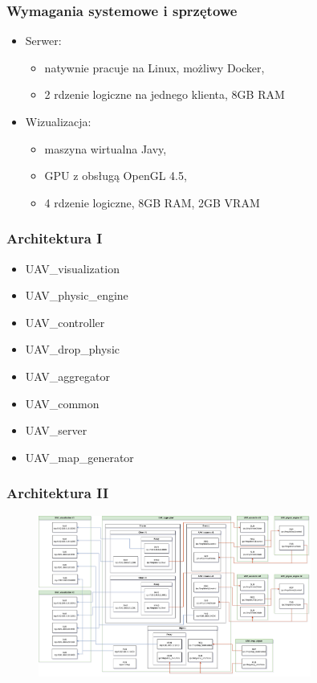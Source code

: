\documentclass[aspectratio=169]{beamer}
\begin{document}
\begin{frame}
	\frametitle{Wymagania systemowe i sprzętowe}
	\begin{itemize}
	\item<2-> Serwer:
		\begin{itemize}
		\item<3-> natywnie pracuje na Linux, możliwy Docker,
		\item<4-> 2 rdzenie logiczne na jednego klienta, 8GB RAM 
		\end{itemize}
	\item<5-> Wizualizacja:
		\begin{itemize}
		\item<6-> maszyna wirtualna Javy,
		\item<7-> GPU z obsługą OpenGL 4.5,
		\item<8-> 4 rdzenie logiczne, 8GB RAM, 2GB VRAM 
		\end{itemize}	
	\end{itemize}
\end{frame}


\begin{frame} %
	\frametitle{Architektura I}
	\begin{itemize}
		\item<2-> UAV\_visualization
		\item<3-> UAV\_physic\_engine
		\item<4-> UAV\_controller
		\item<5-> UAV\_drop\_physic
		\item<6-> UAV\_aggregator
		\item<7-> UAV\_common
		\item<8-> UAV\_server
		\item<9-> UAV\_map\_generator
	\end{itemize}
\end{frame}

\begin{frame}
	\frametitle{Architektura II}
	\begin{figure}
		\centering
		\includegraphics[width=0.8\textwidth]{ZMQinMINIUAV.drawio.png}
	\end{figure}
\end{frame}
\end{document}
